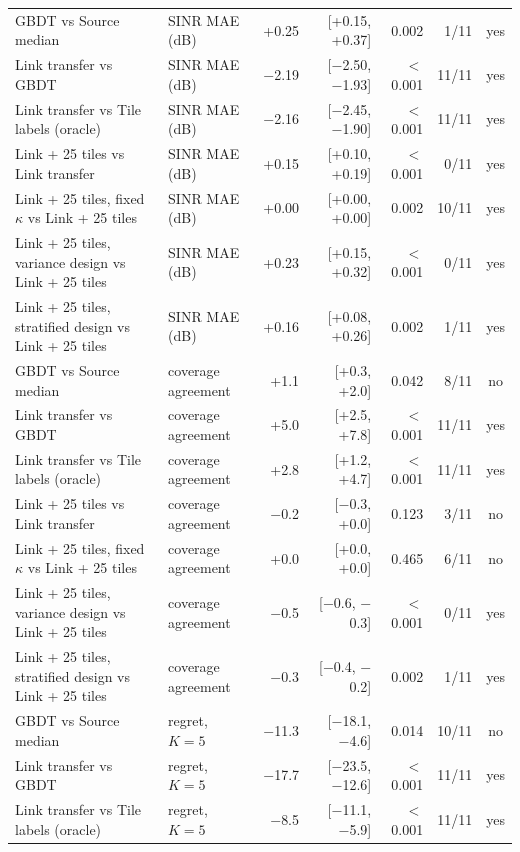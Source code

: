 \begin{tabular}{llrrrrc}
GBDT vs Source median & SINR MAE (dB) & +0.25 & [+0.15, +0.37] & 0.002 & 1/11 & yes \\
Link transfer vs GBDT & SINR MAE (dB) & \ensuremath{-}2.19 & [\ensuremath{-}2.50, \ensuremath{-}1.93] & $<$0.001 & 11/11 & yes \\
Link transfer vs Tile labels (oracle) & SINR MAE (dB) & \ensuremath{-}2.16 & [\ensuremath{-}2.45, \ensuremath{-}1.90] & $<$0.001 & 11/11 & yes \\
Link + 25 tiles vs Link transfer & SINR MAE (dB) & +0.15 & [+0.10, +0.19] & $<$0.001 & 0/11 & yes \\
Link + 25 tiles, fixed $\kappa$ vs Link + 25 tiles & SINR MAE (dB) & +0.00 & [+0.00, +0.00] & 0.002 & 10/11 & yes \\
Link + 25 tiles, variance design vs Link + 25 tiles & SINR MAE (dB) & +0.23 & [+0.15, +0.32] & $<$0.001 & 0/11 & yes \\
Link + 25 tiles, stratified design vs Link + 25 tiles & SINR MAE (dB) & +0.16 & [+0.08, +0.26] & 0.002 & 1/11 & yes \\
GBDT vs Source median & coverage agreement & +1.1 & [+0.3, +2.0] & 0.042 & 8/11 & no \\
Link transfer vs GBDT & coverage agreement & +5.0 & [+2.5, +7.8] & $<$0.001 & 11/11 & yes \\
Link transfer vs Tile labels (oracle) & coverage agreement & +2.8 & [+1.2, +4.7] & $<$0.001 & 11/11 & yes \\
Link + 25 tiles vs Link transfer & coverage agreement & \ensuremath{-}0.2 & [\ensuremath{-}0.3, +0.0] & 0.123 & 3/11 & no \\
Link + 25 tiles, fixed $\kappa$ vs Link + 25 tiles & coverage agreement & +0.0 & [+0.0, +0.0] & 0.465 & 6/11 & no \\
Link + 25 tiles, variance design vs Link + 25 tiles & coverage agreement & \ensuremath{-}0.5 & [\ensuremath{-}0.6, \ensuremath{-}0.3] & $<$0.001 & 0/11 & yes \\
Link + 25 tiles, stratified design vs Link + 25 tiles & coverage agreement & \ensuremath{-}0.3 & [\ensuremath{-}0.4, \ensuremath{-}0.2] & 0.002 & 1/11 & yes \\
GBDT vs Source median & regret, $K{=}5$ & \ensuremath{-}11.3 & [\ensuremath{-}18.1, \ensuremath{-}4.6] & 0.014 & 10/11 & no \\
Link transfer vs GBDT & regret, $K{=}5$ & \ensuremath{-}17.7 & [\ensuremath{-}23.5, \ensuremath{-}12.6] & $<$0.001 & 11/11 & yes \\
Link transfer vs Tile labels (oracle) & regret, $K{=}5$ & \ensuremath{-}8.5 & [\ensuremath{-}11.1, \ensuremath{-}5.9] & $<$0.001 & 11/11 & yes \\

\end{tabular}
